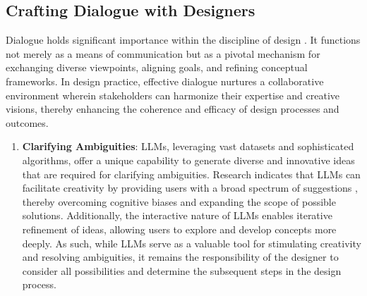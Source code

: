 \documentclass{article}
\begin{document}
\subsection{Crafting Dialogue with Designers}
Dialogue holds significant importance within the discipline of design \cite{bjorkman2004design}. It functions not merely as a means of communication but as a pivotal mechanism for exchanging diverse viewpoints, aligning goals, and refining conceptual frameworks. In design practice, effective dialogue nurtures a collaborative environment wherein stakeholders can harmonize their expertise and creative visions, thereby enhancing the coherence and efficacy of design processes and outcomes.


\begin{enumerate}
    \item \textbf{Clarifying Ambiguities}: LLMs, leveraging vast datasets and sophisticated algorithms, offer a unique capability to generate diverse and innovative ideas that are required for clarifying ambiguities. Research indicates that LLMs can facilitate creativity by providing users with a broad spectrum of suggestions \cite{xu2024jamplate,shaer2024ai}, thereby overcoming cognitive biases and expanding the scope of possible solutions. Additionally, the interactive nature of LLMs enables iterative refinement of ideas, allowing users to explore and develop concepts more deeply. As such, while LLMs serve as a valuable tool for stimulating creativity and resolving ambiguities, it remains the responsibility of the designer to consider all possibilities and determine the subsequent steps in the design process.


\end{enumerate}
\end{document}
